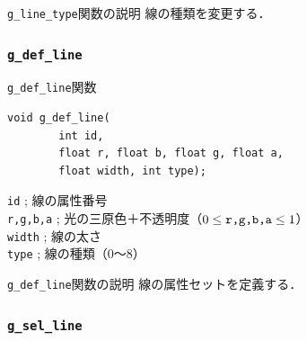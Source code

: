 \documentclass[platex,a4paper,12pt]{jsarticle}%
\begin{document}
\begin{itembox}[l]{\texttt{g\_line\_type}関数の説明}
線の種類を変更する．
\end{itembox}

\begin{figure}[htb]
\end{figure}



\clearpage
\subsubsection{\texttt{g\_def\_line}}

\begin{itembox}[l]{\texttt{g\_def\_line}関数}
\begin{verbatim}
void g_def_line(
        int id,	
        float r, float b, float g, float a,
        float width, int type);
\end{verbatim}
\verb|id| ; 線の属性番号\\
\verb|r,g,b,a| ; 光の三原色＋不透明度（$0\leq \verb|r,g,b,a| \leq 1$）\\
\verb|width| ; 線の太さ\\
\verb|type| ; 線の種類（0〜8）
\end{itembox}

\begin{itembox}[l]{\texttt{g\_def\_line}関数の説明}
線の属性セットを定義する．
\end{itembox}

\begin{figure}[htb]
\end{figure}



\clearpage
\subsubsection{\texttt{g\_sel\_line}}
\end{document}
